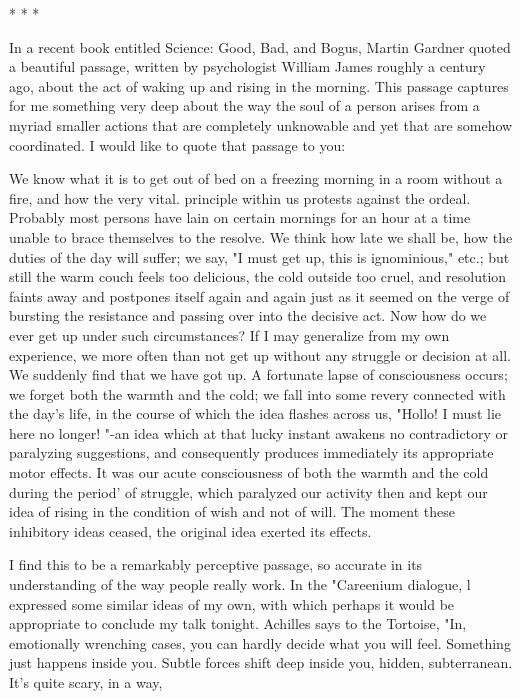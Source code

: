                                        *   *   *

       In a recent book entitled Science: Good, Bad, and Bogus, Martin Gardner
quoted a beautiful passage, written by psychologist William James roughly a century
ago, about the act of waking up and rising in the morning. This passage captures for
me something very deep about the way the soul of a person arises from a myriad
smaller actions that are completely unknowable and yet that are somehow
coordinated. I would like to quote that passage to you:

          We know what it is to get out of bed on a freezing morning in a room
  without a fire, and how the very vital. principle within us protests against the
  ordeal. Probably most persons have lain on certain mornings for an hour at a
  time unable to brace themselves to the resolve. We think how late we shall be,
  how the duties of the day will suffer; we say, "I must get up, this is
  ignominious," etc.; but still the warm couch feels too delicious, the cold outside
  too cruel, and resolution faints away and postpones itself again and again just as
  it seemed on the verge of bursting the resistance and passing over into the
  decisive act. Now how do we ever get up under such circumstances? If I may
  generalize from my own experience, we more often than not get up without any
  struggle or decision at all. We suddenly find that we have got up. A fortunate
  lapse of consciousness occurs; we forget both the warmth and the cold; we fall
  into some revery connected with the day's life, in the course of which the idea
  flashes across us, "Hollo! I must lie here no longer! "-an idea which at that
  lucky instant awakens no contradictory or paralyzing suggestions, and
  consequently produces immediately its appropriate motor effects. It was our
  acute consciousness of both the warmth and the cold during the period' of
  struggle, which paralyzed our activity then and kept our idea of rising in the
  condition of wish and not of will. The moment these inhibitory ideas ceased, the
  original idea exerted its effects.

        I find this to be a remarkably perceptive passage, so accurate in its
understanding of the way people really work. In the "Careenium dialogue, l expressed
some similar ideas of my own, with which perhaps it would be appropriate to
conclude my talk tonight.
        Achilles says to the Tortoise, "In, emotionally wrenching cases, you can
hardly decide what you will feel. Something just happens inside you. Subtle forces
shift deep inside you, hidden, subterranean. It's quite scary, in a way,




